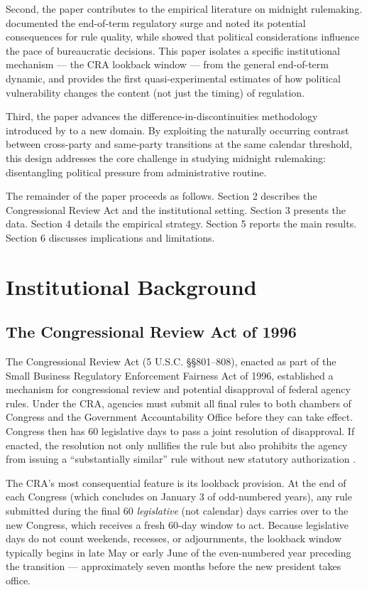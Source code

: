 \documentclass[12pt]{article}
\begin{document}
Second, the paper contributes to the empirical literature on midnight rulemaking. \citet{oconnell2008} documented the end-of-term regulatory surge and noted its potential consequences for rule quality, while \citet{potter2017} showed that political considerations influence the pace of bureaucratic decisions. This paper isolates a specific institutional mechanism --- the CRA lookback window --- from the general end-of-term dynamic, and provides the first quasi-experimental estimates of how political vulnerability changes the content (not just the timing) of regulation.

Third, the paper advances the difference-in-discontinuities methodology introduced by \citet{grembi2016} to a new domain. By exploiting the naturally occurring contrast between cross-party and same-party transitions at the same calendar threshold, this design addresses the core challenge in studying midnight rulemaking: disentangling political pressure from administrative routine.

The remainder of the paper proceeds as follows. Section 2 describes the Congressional Review Act and the institutional setting. Section 3 presents the data. Section 4 details the empirical strategy. Section 5 reports the main results. Section 6 discusses implications and limitations.


\section{Institutional Background}

\subsection{The Congressional Review Act of 1996}

The Congressional Review Act (5 U.S.C. \S\S801--808), enacted as part of the Small Business Regulatory Enforcement Fairness Act of 1996, established a mechanism for congressional review and potential disapproval of federal agency rules. Under the CRA, agencies must submit all final rules to both chambers of Congress and the Government Accountability Office before they can take effect. Congress then has 60 legislative days to pass a joint resolution of disapproval. If enacted, the resolution not only nullifies the rule but also prohibits the agency from issuing a ``substantially similar'' rule without new statutory authorization \citep{carey2021}.

The CRA's most consequential feature is its lookback provision. At the end of each Congress (which concludes on January 3 of odd-numbered years), any rule submitted during the final 60 \textit{legislative} (not calendar) days carries over to the new Congress, which receives a fresh 60-day window to act. Because legislative days do not count weekends, recesses, or adjournments, the lookback window typically begins in late May or early June of the even-numbered year preceding the transition --- approximately seven months before the new president takes office.
\end{document}
